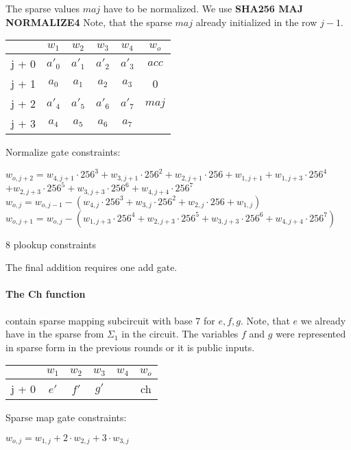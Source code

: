 The sparse values $maj$ have to be normalized.
We use \textbf{SHA256 MAJ NORMALIZE4}
Note, that the sparse $maj$ already initialized in the row $j - 1$.
\begin{center}
    \begin{tabular}{ c|c|c|c|c|c}
        & $w_1$  & $w_2$  & $w_3$  & $w_4$  & $w_o$ \\
        \hline
        j + 0 & $a'_0$ & $a'_1$ & $a'_2$ & $a'_3$ & $acc$ \\
        j + 1 & $a_0$  & $ a_1$ & $a_2$  & $a_3$  & 0     \\
        j + 2 & $a'_4$ & $a'_5$ & $a'_6$ & $a'_7$ & $maj$ \\
        j + 3 & $a_4$  & $ a_5$ & $a_6$  & $a_7$  &       \\
    \end{tabular}
\end{center}

Normalize gate constraints:
\begin{center}
    $w_{o,j+2} = w_{4,j+1} \cdot 256^3 + w_{3,j+1} \cdot 256^2 + w_{2,j+1} \cdot 256 + w_{1,j+1}
    + w_{1,j+3} \cdot 256^4$ \\
    $+ w_{2,j+3} \cdot 256^5+ w_{3,j+3} \cdot 256^6 + w_{4,j+4} \cdot 256^7$ \\
    $w_{o,j} = w_{o, j - 1} - (w_{4,j} \cdot 256^3 + w_{3,j} \cdot 256^2 + w_{2,j} \cdot 256 + w_{1,j})$ \\
    $w_{o,j+1} = w_{o,j} - ( w_{1,j+3} \cdot 256^4 + w_{2,j+3} \cdot 256^5+ w_{3,j+3} \cdot 256^6 + w_{4,j+4} \cdot 256^7)$

    8 plookup constraints \\
\end{center}


The final addition requires one add gate.

\paragraph{The Ch function}
contain sparse mapping subcircuit with base $7$ for $e, f ,g$.
Note, that $e$ we already have in the sparse from $\Sigma_1$ in the circuit.
The variables $f$ and $g$ were represented in sparse form in the previous rounds or it is public inputs.
\begin{center}
    \begin{tabular}{ c|c|c|c|c|c }
        & $w_1$ & $w_2$ & $w_3$ & $w_4$ & $w_o$ \\
        \hline
        j + 0 & $e'$  & $f'$  & $g'$  &       & ch    \\
    \end{tabular}
\end{center}
Sparse map gate constraints:
\begin{center}
    $w_{o, j} = w_{1,j} + 2 \cdot w_{2, j} + 3 \cdot w_{3, j}$ \\
\end{center}

